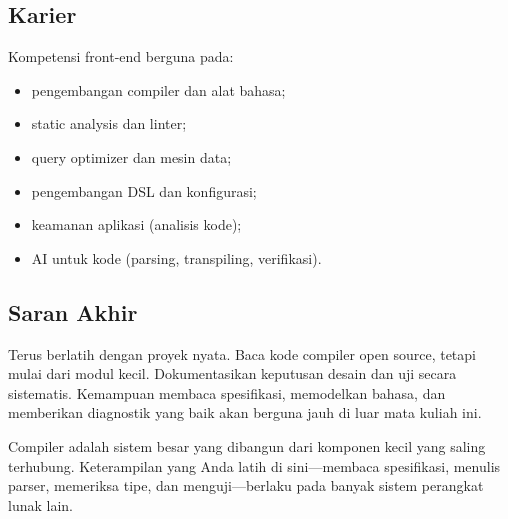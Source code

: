 \subsection{Karier}

Kompetensi front-end berguna pada:
\begin{itemize}[leftmargin=*]
  \item pengembangan compiler dan alat bahasa;
  \item static analysis dan linter;
  \item query optimizer dan mesin data;
  \item pengembangan DSL dan konfigurasi;
  \item keamanan aplikasi (analisis kode);
  \item AI untuk kode (parsing, transpiling, verifikasi).
\end{itemize}

\subsection{Saran Akhir}

Terus berlatih dengan proyek nyata. Baca kode compiler open source,
tetapi mulai dari modul kecil. Dokumentasikan keputusan desain dan
uji secara sistematis. Kemampuan membaca spesifikasi, memodelkan
bahasa, dan memberikan diagnostik yang baik akan berguna jauh di
luar mata kuliah ini.

\begin{infobox}
Compiler adalah sistem besar yang dibangun dari komponen kecil yang
saling terhubung. Keterampilan yang Anda latih di sini---membaca
spesifikasi, menulis parser, memeriksa tipe, dan menguji---berlaku
pada banyak sistem perangkat lunak lain.
\end{infobox}
